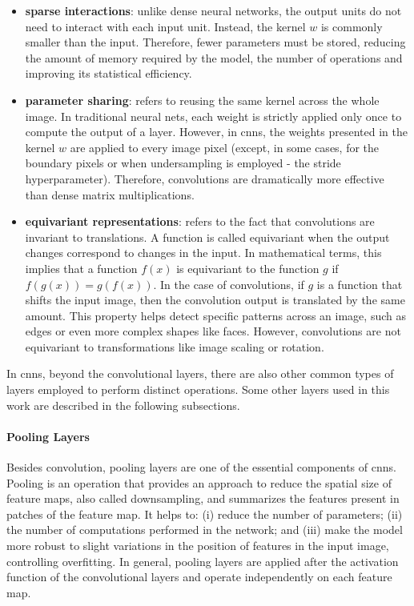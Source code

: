 \begin{itemize}
\item \textbf{sparse interactions}: unlike dense neural networks, the output units do not need to interact with each input unit. Instead, the kernel $w$ is commonly smaller than the input. Therefore, fewer parameters must be stored, reducing the amount of memory required by the model, the number of operations and improving its statistical efficiency.

\item \textbf{parameter sharing}: refers to reusing the same kernel across the whole image. In traditional neural nets, each weight is strictly applied only once to compute the output of a layer. However, in \acsp{cnn}, the weights presented in the kernel $w$ are applied to every image pixel (except, in some cases, for the boundary pixels or when  undersampling is employed - the stride hyperparameter). Therefore, convolutions are dramatically more effective than dense matrix multiplications.

\item \textbf{equivariant representations}: refers to the fact that convolutions are invariant to translations. A function is called equivariant when the output changes correspond to changes in the input. In mathematical terms, this implies that a function $f(x)$ is equivariant to the function $g$ if $f(g(x)) = g(f(x))$. In the case of convolutions, if $g$ is a function that shifts the input image, then the convolution output is translated by the same amount. This property helps detect specific patterns across an image, such as edges or even more complex shapes like faces. However, convolutions are not equivariant to transformations like image scaling or rotation.
\end{itemize}

In \aclp{cnn}, beyond the convolutional layers, there are also other common types of layers employed to perform distinct operations. Some other layers used in this work are described in the following subsections.

\paragraph{Pooling Layers}

Besides convolution, pooling layers are one of the essential components of \aclp{cnn}. Pooling is an operation that provides an approach to reduce the spatial size of feature maps, also called downsampling, and summarizes the features present in patches of the feature map. It helps to: (i) reduce the number of parameters; (ii) the number of computations performed in the network; and (iii) make the model more robust to slight variations in the position of features in the input image, controlling overfitting. In general, pooling layers are applied after the activation function of the convolutional layers and operate independently on each feature map.

